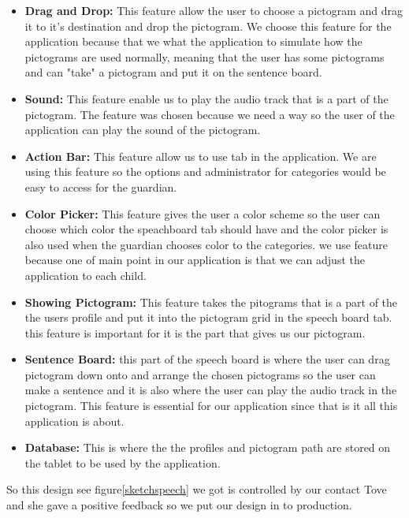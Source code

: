 \begin{itemize}
	\item \textbf{Drag and Drop:} This feature allow the user to choose a pictogram and drag it to it's destination and drop the pictogram.  We choose this feature for the application because that we what the application to simulate how the pictograms are used normally, meaning that the user has some pictograms and can "take" a pictogram and put it on the sentence board.  
	\item \textbf{Sound:} This feature enable us to play the audio track that is a part of the pictogram. The feature was chosen because we need a way so the user of the application can play the sound of the pictogram. 
	\item \textbf{Action Bar:} This feature allow us to use tab in the application. We are using this feature so the options and administrator for categories would be easy to access for the guardian. 
	\item \textbf{Color Picker:} This feature gives the user a color scheme so the user can choose which color the speachboard tab should have and the color picker is also used when the guardian chooses color to the categories. we use feature because one of main point in our application is that we can adjust the application to each child. 
	\item \textbf{Showing Pictogram:} This feature takes the pitograms that is a part of the the users profile and put it into the pictogram grid in the speech board tab. this feature is important for it is the part that gives us our pictogram. 
	\item \textbf{Sentence Board:} this part of the speech board is where the user can drag pictogram down onto and arrange the chosen pictograms so the user can make a sentence and it is also where the user can play the audio track in the pictogram. This feature is essential for our application since that is it all this application is about. 
	\item \textbf{Database:} This is where the the profiles and pictogram path are stored on the tablet to be used by the application.
\end{itemize}

So this design see figure\ref{sketchspeech} we got is controlled by our contact Tove and she gave a positive feedback so we put our design in to production.   